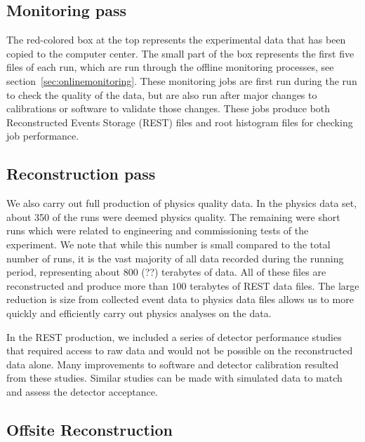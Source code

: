 \subsection{Monitoring pass \label{sec:recmonitoring}}

The red-colored box at the top represents the experimental data that has been copied to the computer center. The small part of the box represents the first five files of each run, which are run through the offline monitoring processes, see section~\ref{sec:onlinemonitoring}. These monitoring jobs are first run during the run to check the quality of the data, but are also run after major changes to calibrations or software to validate those changes. These jobs produce both Reconstructed Events Storage (REST) files and root histogram files for checking job performance.

\subsection{Reconstruction pass \label{sec:recreconstruction}}

We also carry out full production of physics quality data. In the physics data set, about 350 of the
runs were deemed physics quality. The remaining were short runs which were related to engineering and commissioning tests of the experiment. We note that while this number is small compared to the total number of runs, it is the vast majority of all data recorded during the running period, representing about $800$ (??) terabytes of data. All of these files are reconstructed and produce more than $100$ terabytes of REST data files. The large reduction is size from collected event data to physics data files allows us to  more quickly and efficiently carry out physics analyses on the data.

In the REST production, we included a series of detector performance studies that required access to raw data and would not be possible on the reconstructed data alone. Many improvements to software and detector calibration resulted from these studies. Similar studies can be made with simulated data to match and assess the detector acceptance.

\subsection{Offsite Reconstruction}
\label{sec:recoffsite}


